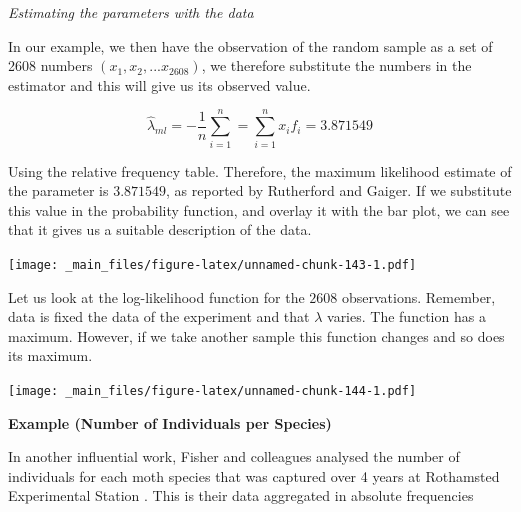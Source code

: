 \documentclass[
]{book}
\begin{document}
\emph{Estimating the parameters with the data}

In our example, we then have the observation of the random sample as a set of 2608 numbers \((x_1, x_2, ...x_{2608})\), we therefore substitute the numbers in the estimator and this will give us its observed value.

\[\hat{\lambda}_{ml}=-\frac{1}{n}\sum_{i=1}^{n} =\sum_{i=1}^{n} x_if_i =3.871549\]

Using the relative frequency table. Therefore, the maximum likelihood estimate of the parameter is \(3.871549\), as reported by Rutherford and Gaiger. If we substitute this value in the probability function, and overlay it with the bar plot, we can see that it gives us a suitable description of the data.

\texttt{[image: \_main\_files/figure-latex/unnamed-chunk-143-1.pdf]}

Let us look at the log-likelihood function for the \(2608\) observations. Remember, data is fixed the data of the experiment and that \(\lambda\) varies. The function has a maximum. However, if we take another sample this function changes and so does its maximum.

\texttt{[image: \_main\_files/figure-latex/unnamed-chunk-144-1.pdf]}

\textbf{Example (Number of Individuals per Species)}

In another influential work, Fisher and colleagues analysed the number of individuals for each moth species that was captured over 4 years at Rothamsted Experimental Station \citep{fisher1943species}. This is their data aggregated in absolute frequencies
\end{document}
